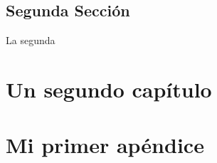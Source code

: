 \section{Segunda Secci\'on}
La segunda 

\chapter{Un segundo cap\'itulo}
%
\minitoc%

\section{}
\section{}


\appendix
\chapter{Mi primer ap\'endice}